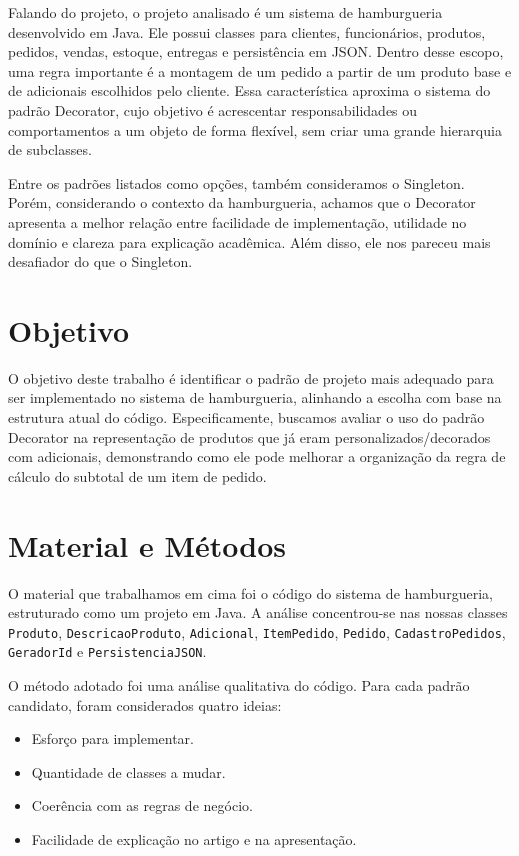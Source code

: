 \documentclass[12pt]{article}
\begin{document}
Falando do projeto, o projeto analisado é um sistema de hamburgueria desenvolvido em Java. Ele possui classes para clientes, funcionários, produtos, pedidos, vendas, estoque, entregas e persistência em JSON. Dentro desse escopo, uma regra importante é a montagem de um pedido a partir de um produto base e de adicionais escolhidos pelo cliente. Essa característica aproxima o sistema do padrão Decorator, cujo objetivo é acrescentar responsabilidades ou comportamentos a um objeto de forma flexível, sem criar uma grande hierarquia de subclasses.

Entre os padrões listados como opções, também consideramos o Singleton. Porém, considerando o contexto da hamburgueria, achamos que o Decorator apresenta a melhor relação entre facilidade de implementação, utilidade no domínio e clareza para explicação acadêmica. Além disso, ele nos pareceu mais desafiador do que o Singleton.

\section{Objetivo}

O objetivo deste trabalho é identificar o padrão de projeto mais adequado para ser implementado no sistema de hamburgueria, alinhando a escolha com base na estrutura atual do código. Especificamente, buscamos avaliar o uso do padrão Decorator na representação de produtos que já eram personalizados/decorados com adicionais, demonstrando como ele pode melhorar a organização da regra de cálculo do subtotal de um item de pedido.

\section{Material e Métodos}

O material que trabalhamos em cima foi o código do sistema de hamburgueria, estruturado como um projeto em Java. A análise concentrou-se nas nossas classes \texttt{Produto}, \texttt{DescricaoProduto}, \texttt{Adicional}, \texttt{ItemPedido}, \texttt{Pedido}, \texttt{CadastroPedidos}, \texttt{GeradorId} e \texttt{PersistenciaJSON}. 

O método adotado foi uma análise qualitativa do código. Para cada padrão candidato, foram considerados quatro ideias:

\begin{itemize}
    \item Esforço para implementar.
    \item Quantidade de classes a mudar.
    \item Coerência com as regras de negócio.
    \item Facilidade de explicação no artigo e na apresentação.
\end{itemize}
\end{document}
